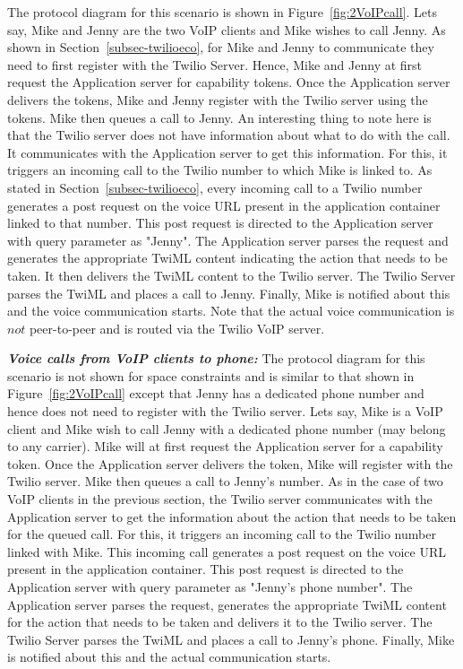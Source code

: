 The protocol diagram for this scenario is shown in Figure~\ref{fig:2VoIPcall}. Lets say, Mike and Jenny are the two VoIP clients and Mike wishes to call Jenny. As shown in Section~\ref{subsec-twilioeco}, for Mike and Jenny to communicate they need to first register with the Twilio Server. Hence, Mike and Jenny at first request the Application server for capability tokens. Once the Application server delivers the tokens, Mike and Jenny register with the Twilio server using the tokens. Mike then queues a call to Jenny. An interesting thing to note here is that the Twilio server does not have information about what to do with the call. It communicates with the Application server to get this information. For this, it triggers an incoming call to the Twilio number to which Mike is linked to. As stated in Section~\ref{subsec-twilioeco}, every incoming call to a Twilio number generates a post request on the voice URL present in the application container linked to that number. This post request is directed to the Application server with query parameter as "Jenny". The Application server parses the request and generates the appropriate TwiML content indicating the action that needs to be taken. It then delivers the TwiML content to the Twilio server. The Twilio Server parses the TwiML and places a call to Jenny. Finally, Mike is notified about this and the voice communication starts. Note that the actual voice communication is $not$ peer-to-peer and is routed via the Twilio VoIP server.  

\emph{\textbf{Voice calls from VoIP clients to phone:} }
The protocol diagram for this scenario is not shown for space constraints and is similar to that shown in Figure~\ref{fig:2VoIPcall} except that Jenny has a dedicated phone number and hence does not need to register with the Twilio server. Lets say, Mike is a VoIP client and Mike wish to call Jenny with a dedicated phone number (may belong to any carrier). Mike will at first request the Application server for a capability token. Once the Application server delivers the token, Mike will register with the Twilio server. Mike then queues a call to Jenny's number. As in the case of two VoIP clients in the previous section, the Twilio server communicates with the Application server to get the information about the action that needs to be taken for the queued call. For this, it triggers an incoming call to the Twilio number linked with Mike. This incoming call generates a post request on the voice URL present in the application container. This post request is directed to the Application server with query parameter as "Jenny's phone number". The Application server parses the request, generates the appropriate TwiML content for the action that needs to be taken and delivers it to the Twilio server. The Twilio Server parses the TwiML and places a call to Jenny's phone. Finally, Mike is notified about this and the actual communication starts. 


